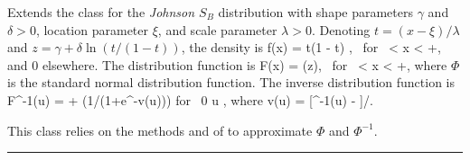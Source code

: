 
Extends the class  for
the {\em Johnson $S_B$\/} distribution
with shape parameters $\gamma$ and $\delta > 0$, location parameter $\xi$,
and scale parameter $\lambda>0$.
Denoting $t=(x-\xi)/\lambda$ and $z = \gamma + \delta\ln (t/(1-t))$, the density is
\eq
 f(x) = 
 {\lambda t(1 - t)\sqrt{2\pi}}
 \html{)}, \qquad
  \mbox { for } \xi < x < \xi+\lambda,     
\endeq
and 0 elsewhere.  The distribution function is
\eq
 F(x) = \Phi (z),
     \mbox { for } \xi < x < \xi+\lambda,   
\endeq
where $\Phi$ is the standard normal distribution function.
The inverse distribution function is
\eq
  F^{-1}(u) = \xi + \lambda \left(1/\left(1+e^{-v(u)}\right)\right) \qquad\mbox{for }  0 \le u ,
\endeq
where
\eq
  v(u) = [\Phi^{-1}(u) - \gamma]/\delta.
\endeq

This class relies on the methods   and
of  to approximate $\Phi$ and $\Phi^{-1}$.

\bigskip\hrule

